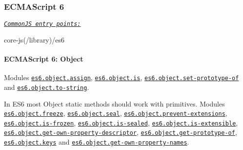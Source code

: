 \subsubsection*{E\+C\+M\+A\+Script 6}

\href{#commonjs}{\tt {\itshape Common\+JS entry points\+:}} 
\begin{DoxyCode}
core-js(/library)/es6
\end{DoxyCode}
 \paragraph*{E\+C\+M\+A\+Script 6\+: Object}

Modules \href{https://github.com/zloirock/core-js/blob/v2.6.0/modules/es6.object.assign.js}{\tt {\ttfamily es6.\+object.\+assign}}, \href{https://github.com/zloirock/core-js/blob/v2.6.0/modules/es6.object.is.js}{\tt {\ttfamily es6.\+object.\+is}}, \href{https://github.com/zloirock/core-js/blob/v2.6.0/modules/es6.object.set-prototype-of.js}{\tt {\ttfamily es6.\+object.\+set-\/prototype-\/of}} and \href{https://github.com/zloirock/core-js/blob/v2.6.0/modules/es6.object.to-string.js}{\tt {\ttfamily es6.\+object.\+to-\/string}}.

In E\+S6 most {\ttfamily Object} static methods should work with primitives. Modules \href{https://github.com/zloirock/core-js/blob/v2.6.0/modules/es6.object.freeze.js}{\tt {\ttfamily es6.\+object.\+freeze}}, \href{https://github.com/zloirock/core-js/blob/v2.6.0/modules/es6.object.seal.js}{\tt {\ttfamily es6.\+object.\+seal}}, \href{https://github.com/zloirock/core-js/blob/v2.6.0/modules/es6.object.prevent-extensions.js}{\tt {\ttfamily es6.\+object.\+prevent-\/extensions}}, \href{https://github.com/zloirock/core-js/blob/v2.6.0/modules/es6.object.is-frozen.js}{\tt {\ttfamily es6.\+object.\+is-\/frozen}}, \href{https://github.com/zloirock/core-js/blob/v2.6.0/modules/es6.object.is-sealed.js}{\tt {\ttfamily es6.\+object.\+is-\/sealed}}, \href{https://github.com/zloirock/core-js/blob/v2.6.0/modules/es6.object.is-extensible.js}{\tt {\ttfamily es6.\+object.\+is-\/extensible}}, \href{https://github.com/zloirock/core-js/blob/v2.6.0/modules/es6.object.get-own-property-descriptor.js}{\tt {\ttfamily es6.\+object.\+get-\/own-\/property-\/descriptor}}, \href{https://github.com/zloirock/core-js/blob/v2.6.0/modules/es6.object.get-prototype-of.js}{\tt {\ttfamily es6.\+object.\+get-\/prototype-\/of}}, \href{https://github.com/zloirock/core-js/blob/v2.6.0/modules/es6.object.keys.js}{\tt {\ttfamily es6.\+object.\+keys}} and \href{https://github.com/zloirock/core-js/blob/v2.6.0/modules/es6.object.get-own-property-names.js}{\tt {\ttfamily es6.\+object.\+get-\/own-\/property-\/names}}.

